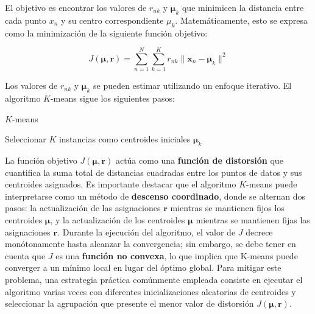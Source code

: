 El objetivo es encontrar los valores de \(r_{nk}\) y \(\boldsymbol{\mu}_{k}\) que minimicen la distancia entre cada punto \(x_{n}\) y su centro correspondiente \(\mu_{k}\). Matemáticamente, esto se expresa como la minimización de la siguiente función objetivo:

\[
J(\boldsymbol{\mu},\boldsymbol{r}) = \sum_{n=1}^{N} \sum_{k=1}^{K} r_{nk} \| \boldsymbol{x}_n - \boldsymbol{\mu}_k \|^2
\]

Los valores de \(r_{nk}\) y \(\boldsymbol{\mu}_{k}\) se pueden estimar utilizando un enfoque iterativo. El algoritmo \(K\)-means sigue los siguientes pasos:

\begin{algorithm}[ht]
\caption{\(K\)-means}
\SetAlgoLined
Seleccionar $K$ instancias como centroides iniciales $\boldsymbol{\mu}_k$\;
\end{algorithm}

La función objetivo $J(\boldsymbol{\mu},\boldsymbol{r})$ actúa como una \textbf{función de distorsión} que cuantifica la suma total de distancias cuadradas entre los puntos de datos y sus centroides asignados. Es importante destacar que el algoritmo \(K\)-means puede interpretarse como un método de \textbf{descenso coordinado}, donde se alternan dos pasos: la actualización de las asignaciones $\boldsymbol{r}$ mientras se mantienen fijos los centroides $\boldsymbol{\mu}$, y la actualización de los centroides $\boldsymbol{\mu}$ mientras se mantienen fijas las asignaciones $\boldsymbol{r}$. Durante la ejecución del algoritmo, el valor de $J$ decrece monótonamente hasta alcanzar la convergencia; sin embargo, se debe tener en cuenta que $J$ es una \textbf{función no convexa}, lo que implica que K-means puede converger a un mínimo local en lugar del óptimo global. Para mitigar este problema, una estrategia práctica comúnmente empleada consiste en ejecutar el algoritmo varias veces con diferentes inicializaciones aleatorias de centroides y seleccionar la agrupación que presente el menor valor de distorsión $J(\boldsymbol{\mu},\boldsymbol{r})$.

